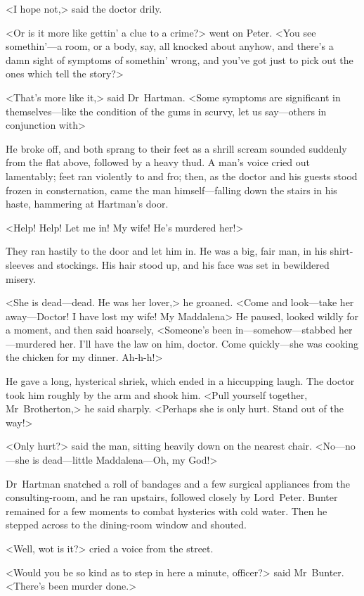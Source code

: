 <I hope not,> said the doctor drily.

<Or is it more like gettin' a clue to a crime?> went on Peter. <You see somethin'—a room, or a body, say, all knocked about anyhow, and there's a damn sight of symptoms of somethin' wrong, and you've got just to pick out the ones which tell the story?>

<That's more like it,> said Dr~Hartman. <Some symptoms are significant in themselves—like the condition of the gums in scurvy, let us say—others in conjunction with\longdash>

He broke off, and both sprang to their feet as a shrill scream sounded suddenly from the flat above, followed by a heavy thud. A man's voice cried out lamentably; feet ran violently to and fro; then, as the doctor and his guests stood frozen in consternation, came the man himself—falling down the stairs in his haste, hammering at Hartman's door.

<Help! Help! Let me in! My wife! He's murdered her!>

They ran hastily to the door and let him in. He was a big, fair man, in his shirt-sleeves and stockings. His hair stood up, and his face was set in bewildered misery.

<She is dead—dead. He was her lover,> he groaned. <Come and look—take her away—Doctor! I have lost my wife! My Maddalena\longdash> He paused, looked wildly for a moment, and then said hoarsely, <Someone's been in—somehow—stabbed her—murdered her. I'll have the law on him, doctor. Come quickly—she was cooking the chicken for my dinner. Ah-h-h!>

He gave a long, hysterical shriek, which ended in a hiccupping laugh. The doctor took him roughly by the arm and shook him. <Pull yourself together, Mr~Brotherton,> he said sharply. <Perhaps she is only hurt. Stand out of the way!>

<Only hurt?> said the man, sitting heavily down on the nearest chair. <No—no—she is dead—little Maddalena—Oh, my God!>

Dr~Hartman snatched a roll of bandages and a few surgical appliances from the consulting-room, and he ran upstairs, followed closely by Lord~Peter. Bunter remained for a few moments to combat hysterics with cold water. Then he stepped across to the dining-room window and shouted.

<Well, wot is it?> cried a voice from the street.

<Would you be so kind as to step in here a minute, officer?> said Mr~Bunter. <There's been murder done.>

